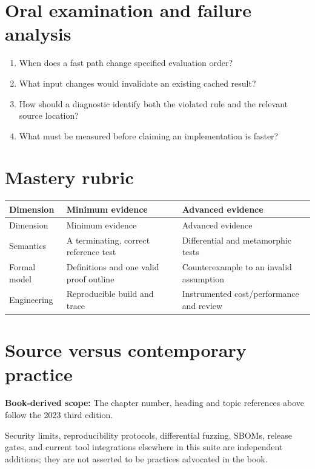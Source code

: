 \documentclass[10pt,letterpaper]{article}
\begin{document}
\section{Oral examination and failure analysis}
\begin{enumerate}
\item When does a fast path change specified evaluation order?
\item What input changes would invalidate an existing cached result?
\item How should a diagnostic identify both the violated rule and the relevant source location?
\item What must be measured before claiming an implementation is faster?
\end{enumerate}

\section{Mastery rubric}
\begin{longtable}{|>{\raggedright\arraybackslash}p{}|>{\raggedright\arraybackslash}p{}|>{\raggedright\arraybackslash}p{}|}
\hline
Dimension & Minimum evidence & Advanced evidence\\ \hline\endfirsthead
\hline
Dimension & Minimum evidence & Advanced evidence\\ \hline\endhead
Semantics & A terminating, correct reference test & Differential and metamorphic tests\\ \hline
Formal model & Definitions and one valid proof outline & Counterexample to an invalid assumption\\ \hline
Engineering & Reproducible build and trace & Instrumented cost/performance and review\\ \hline
\end{longtable}

\section{Source versus contemporary practice}
\textbf{Book-derived scope:} The chapter number, heading and topic references above follow the 2023 third edition.\par\modern Security limits, reproducibility protocols, differential fuzzing, SBOMs, release gates, and current tool integrations elsewhere in this suite are independent additions; they are not asserted to be practices advocated in the book.
\end{document}
